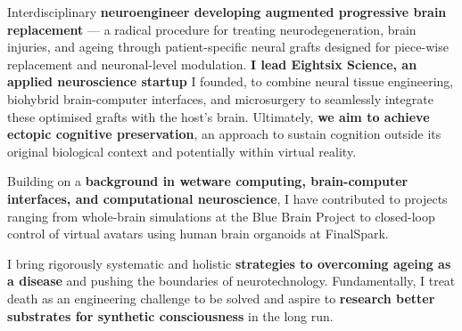 Interdisciplinary \textbf{neuroengineer developing augmented progressive brain replacement} — a radical procedure for treating neurodegeneration, brain injuries, and ageing through patient-specific neural grafts designed for piece-wise replacement and neuronal-level modulation. \textbf{I lead Eightsix Science, an applied neuroscience startup} I founded, to combine neural tissue engineering, biohybrid brain-computer interfaces, and microsurgery to seamlessly integrate these optimised grafts with the host’s brain. Ultimately, \textbf{we aim to achieve ectopic cognitive preservation}, an approach to sustain cognition outside its original biological context and potentially within virtual reality.

Building on a \textbf{background in wetware computing, brain-computer interfaces, and computational neuroscience}, I have contributed to projects ranging from whole-brain simulations at the Blue Brain Project to closed-loop control of virtual avatars using human brain organoids at FinalSpark.

I bring rigorously systematic and holistic \textbf{strategies to overcoming ageing as a disease} and pushing the boundaries of neurotechnology. Fundamentally, I treat death as an engineering challenge to be solved and aspire to \textbf{research better substrates for synthetic consciousness} in the long run.